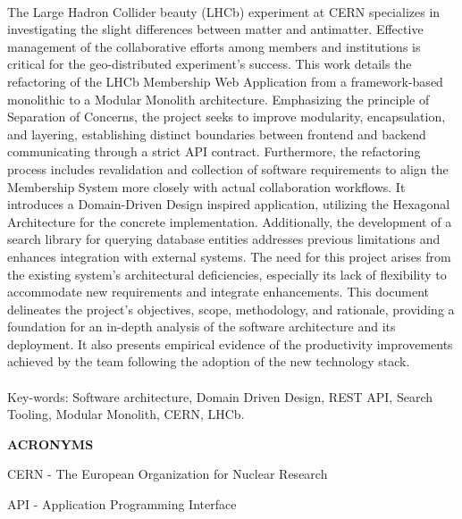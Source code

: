 \paragraph{}The Large Hadron Collider beauty (LHCb) experiment at CERN specializes in investigating the slight differences between matter and antimatter. Effective management of the collaborative efforts among members and institutions is critical for the geo-distributed experiment's success. This work details the refactoring of the LHCb Membership Web Application from a framework-based monolithic to a Modular Monolith architecture. Emphasizing the principle of Separation of Concerns, the project seeks to improve modularity, encapsulation, and layering, establishing distinct boundaries between frontend and backend communicating through a strict API contract. Furthermore, the refactoring process includes revalidation and collection of software requirements to align the Membership System more closely with actual collaboration workflows. It introduces a Domain-Driven Design inspired application, utilizing the Hexagonal Architecture for the concrete implementation. Additionally, the development of a search library for querying database entities addresses previous limitations and enhances integration with external systems. The need for this project arises from the existing system's architectural deficiencies, especially its lack of flexibility to accommodate new requirements and integrate enhancements. This document delineates the project's objectives, scope, methodology, and rationale, providing a foundation for an in-depth analysis of the software architecture and its deployment. It also presents empirical evidence of the productivity improvements achieved by the team following the adoption of the new technology stack.

\paragraph{}
\noindent Key-words: Software architecture, Domain Driven Design, REST API, Search Tooling, Modular Monolith, CERN, LHCb.

\pagebreak


\begin{center}
\textbf{ACRONYMS}
\end{center}
      \vspace{0.5cm}

\noindent CERN - The European Organization for Nuclear Research

\noindent API - Application Programming Interface

